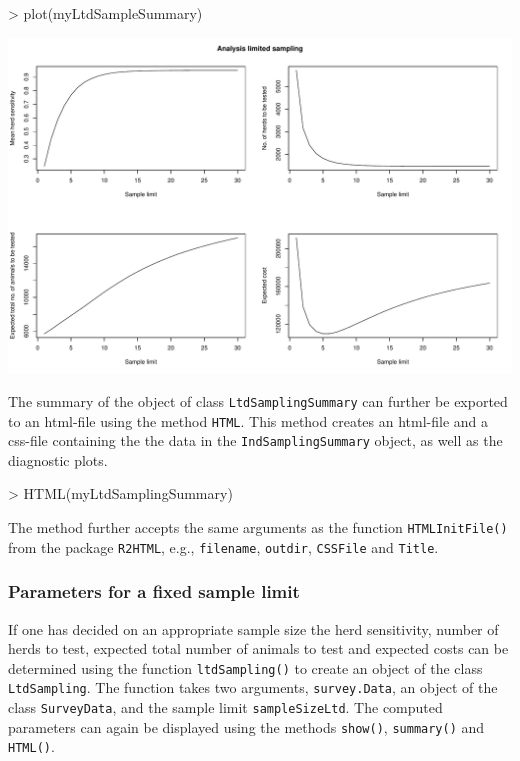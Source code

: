 \documentclass[nojss]{jss}
\begin{document}
\begin{Schunk}
\begin{Sinput}
> plot(myLtdSampleSummary)
\end{Sinput}
\end{Schunk}
\includegraphics{FFD-intro-009}

The summary of the object of class \texttt{LtdSamplingSummary} can further be exported to an html-file using the method \texttt{HTML}.  This method creates an html-file and a css-file containing the the data in the \texttt{IndSamplingSummary} object, as well as the diagnostic plots.


\begin{Schunk}
\begin{Sinput}
> HTML(myLtdSamplingSummary)
\end{Sinput}
\end{Schunk}

The method further accepts the same arguments as the function \texttt{HTMLInitFile()} from the package \texttt{R2HTML}, e.g., \texttt{filename}, \texttt{outdir}, \texttt{CSSFile} and \texttt{Title}.

\subsubsection{Parameters for a fixed sample limit}

If one has decided on an appropriate sample size the herd sensitivity, number of herds to test, expected total number of animals to test and expected costs can be determined using the function \texttt{ltdSampling()}  to create an object of the class \texttt{LtdSampling}.   The function takes two arguments, \texttt{survey.Data}, an object of the class \texttt{SurveyData}, and the sample limit \texttt{sampleSizeLtd}. The computed parameters can again be displayed using the methods \texttt{show()}, \texttt{summary()} and \texttt{HTML()}.   
\end{document}
